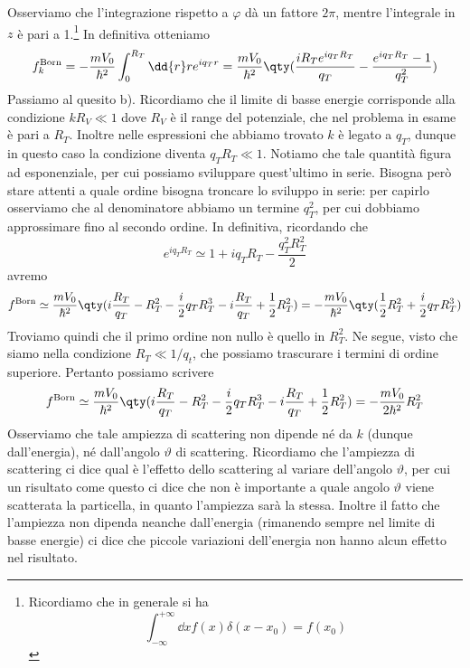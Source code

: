 \begin{soluzione}
\begin{equation*}
   \end{equation*}
   Osserviamo che l'integrazione rispetto a $\varphi$ dà un fattore $2\pi$, mentre l'integrale in $z$ è pari a 1.\footnote{Ricordiamo che in generale si ha
   \begin{equation*}
      \int_{-\infty}^{+\infty} \dd{x} f(x) \delta(x - x_0)=f(x_0)
   \end{equation*}} In definitiva otteniamo
   \begin{equation*}
      f_k^{\rm Born}
      =-\frac{m V_0}{\hbar^2} \int_{0}^{R_T} \dd{r} r e^{i q_T r}
      =\frac{m V_0}{\hbar^2} \qty( \frac{i R_T e^{i q_T R_T}}{q_T} - \frac{e^{i q_T R_T} - 1}{q_T^2})
   \end{equation*}
   Passiamo al quesito b). Ricordiamo che il limite di basse energie corrisponde alla condizione $k R_V \ll 1$ dove $R_V$ è il range del potenziale, che nel problema in esame è pari a $R_T$. Inoltre nelle espressioni che abbiamo trovato $k$ è legato a $q_T$, dunque in questo caso la condizione diventa $q_T R_T \ll 1$. Notiamo che tale quantità figura ad esponenziale, per cui possiamo sviluppare quest'ultimo in serie. Bisogna però stare attenti a quale ordine bisogna troncare lo sviluppo in serie: per capirlo osserviamo che al denominatore abbiamo un termine $q_T^2$, per cui dobbiamo approssimare fino al secondo ordine. In definitiva, ricordando che
   \begin{equation*}
      e^{i q_T R_T}
      \simeq 1 + i q_T R_T - \frac{q_T^2 R_T^2}{2}
   \end{equation*}
   avremo
   \begin{equation*}
      f^{\rm Born}
      \simeq \frac{m V_0}{\hbar^2} \qty( i \frac{R_T}{q_T} - R_T^2 - \frac{i}{2} q_T R_T^3 - i \frac{R_T}{q_T} + \frac{1}{2} R_T^2)
      =-\frac{m V_0}{\hbar^2} \qty( \frac{1}{2} R_T^2 + \frac{i}{2} q_T R_T^3 )
   \end{equation*}
   Troviamo quindi che il primo ordine non nullo è quello in $R_T^2$. Ne segue, visto che siamo nella condizione $R_T \ll 1/q_t$, che possiamo trascurare i termini di ordine superiore. Pertanto possiamo scrivere
   \begin{equation*}
      f^{\rm Born}
      \simeq \frac{m V_0}{\hbar^2} \qty( i \frac{R_T}{q_T} - R_T^2 - \frac{i}{2} q_T R_T^3 - i \frac{R_T}{q_T} + \frac{1}{2} R_T^2)
      =-\frac{m V_0}{2 \hbar^2} R_T^2
   \end{equation*}
   Osserviamo che tale ampiezza di scattering non dipende né da $k$ (dunque dall'energia), né dall'angolo $\vartheta$ di scattering. Ricordiamo che l'ampiezza di scattering ci dice qual è l'effetto dello scattering al variare dell'angolo $\vartheta$, per cui un risultato come questo ci dice che non è importante a quale angolo $\vartheta$ viene scatterata la particella, in quanto l'ampiezza sarà la stessa. Inoltre il fatto che l'ampiezza non dipenda neanche dall'energia (rimanendo sempre nel limite di basse energie) ci dice che piccole variazioni dell'energia non hanno alcun effetto nel risultato.\\

\end{soluzione}
